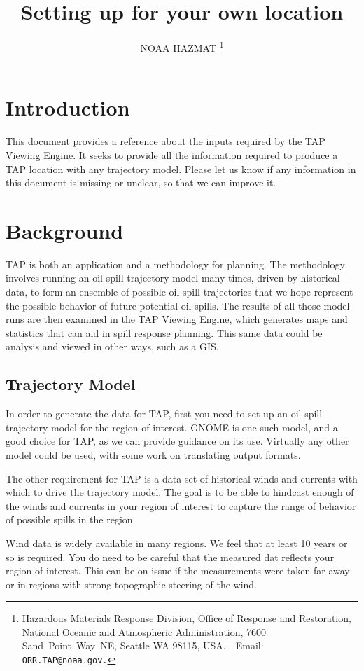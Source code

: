 \documentclass[12pt]{article}      %
\title{Setting up \tap for your own location}    %
\author{NOAA HAZMAT
\thanks{Hazardous Materials Response Division,
Office of Response and Restoration,
National Oceanic and Atmospheric Administration,
7600 Sand~Point~Way~NE, Seattle WA 98115, USA.\ \ Email:\texttt{ ORR.TAP@noaa.gov.}}}
\newcommand{\tap}{\textsf{TAP}\xspace}
\begin{document}
\maketitle
\tableofcontents
\section{Introduction}


This document provides a reference about the inputs required by the \tap
Viewing Engine. It seeks to provide all the information required to
produce a \tap location with any trajectory model. Please let us know if
any information in this document is missing or unclear, so that we can
improve it.

\section{Background}

\tap is both an application and a methodology for planning. The methodology involves running an oil spill trajectory model many times, driven by historical data, to form an ensemble of possible oil spill trajectories that we hope represent the possible behavior of future potential oil spills. The results of all those model runs are then examined in the \tap Viewing Engine, which generates maps and statistics that can aid in spill response planning. This same data could be analysis and viewed in other ways, such as a GIS.

\subsection{Trajectory Model}
In order to generate the data for TAP, first you need to set up an oil spill trajectory model for the region of interest. GNOME is one such model, and a good choice for TAP, as we can provide guidance on its use. Virtually any other model could be used, with some work on translating output formats.

The other requirement for TAP is a data set of historical winds and currents with which to drive the trajectory model. The goal is to be able to hindcast enough of the winds and currents in your region of interest to capture the range of behavior of possible spills in the region.

Wind data is widely available in many regions. We feel that at least 10 years or so is required. You do need to be careful that the measured dat reflects your region of interest. This can be on issue if the measurements were taken far away or in regions with strong topographic steering of the wind.
\end{document}
